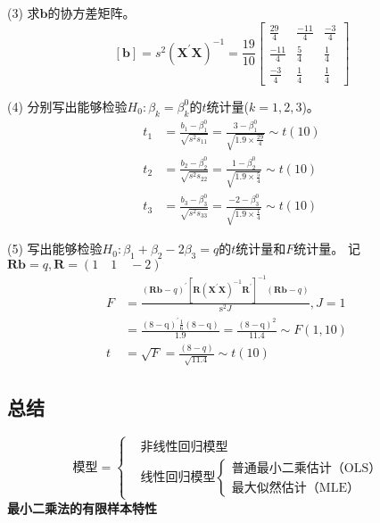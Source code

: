  (3) 求$ \boldsymbol{b} $的协方差矩阵。
 $$ [\boldsymbol{b}]=s^{2}\left(\boldsymbol{X}^{\prime} \boldsymbol{X}\right)^{-1}=\frac{19}{10}
 	\left[\begin{array}{ccc}
	\frac{29}{4} & \frac{-11}{4} & \frac{-3}{4} \\
	\frac{-11}{4} & \frac{5}{4} & \frac{1}{4} \\
	\frac{-3}{4} & \frac{1}{4} & \frac{1}{4}
	\end{array}\right] $$

 (4) 分别写出能够检验$ H_{0}: \beta_{k}=\beta_{k}^{0} $的$ t $统计量($ k=1,2,3 $)。
 \begin{align*}
    t_{1} & = \frac{b_{1}-\beta_{1}^{0}}{\sqrt{s^{2} s_{11}}}=\frac{3-\beta_{1}^{0}}{\sqrt{1.9 \times \frac{29}{4}}} \sim t(10) \\
	t_{2} & = \frac{b_{2}-\beta_{2}^{0}}{\sqrt{s^{2} s_{22}}}=\frac{1-\beta_{2}^{0}}{\sqrt{1.9 \times \frac{5}{4}}} \sim t(10)  \\
	t_{3} &=  \frac{b_{3}-\beta_{3}^{0}}{\sqrt{s^{2} s_{33}}}=\frac{-2-\beta_{3}^{0}}{\sqrt{1.9 \times \frac{1}{4}}} \sim t(10)  
 \end{align*}

 (5) 写出能够检验$ H_{0}: \beta_{1}+\beta_{2}-2 \beta_{3}=q $的$ t $统计量和$ F $统计量。
 记   $ \boldsymbol{R b}=q, \boldsymbol{R}=\left(1 \quad 1 \quad -2 \right) $ 
 \begin{align*} 
	F &= \frac{(\boldsymbol{Rb}-q)^{\prime}\left[\boldsymbol{R}\left(\boldsymbol{X}^{\prime} \boldsymbol{X}\right)^{-1} 
	      \boldsymbol{R}^{\prime}\right]^{-1}(\boldsymbol{Rb}-q)}{\mathrm{s}^{2}J}, J=1 & \\
	  &  =\frac{(8-\mathrm{q})^{\prime}\frac{1}{6}(8-\mathrm{q})}{1.9}=\frac{(8-\mathrm{q})^{2}}{11.4} \sim F(1,10) & \\
	t & = \sqrt{F}=\frac{(8-q)}{\sqrt{11.4}} \sim t(10) 
 \end{align*}

\subsection{总结} 
$$ \text{模型}=\left\{
\begin{aligned}
	&\text{非线性回归模型} \\
	&\text{线性回归模型}{ \left\{
		\begin{aligned}
			\text{普通最小二乘估计（OLS）} \\
			\text{最大似然估计（MLE）}
		\end{aligned}\right.}
\end{aligned}\right. $$
\textbf{最小二乘法的有限样本特性}

